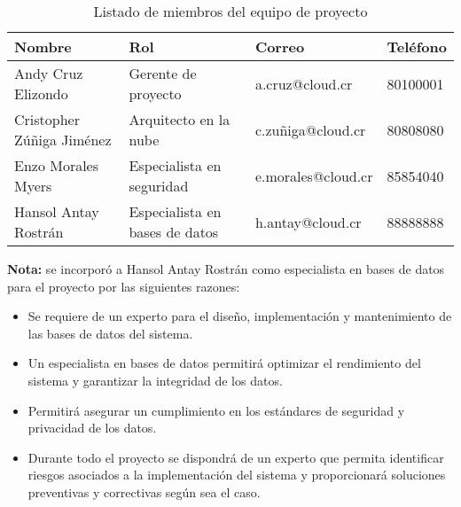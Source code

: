   \begin{table}[H]
        \centering
        \caption{Listado de miembros del equipo de proyecto}
        \begin{tabular}{|p{4.5cm}|p{3.9cm}|p{3.5cm}|p{2cm}|}
            \hline
            \rowcolor{darkblue}
            \color{white} Nombre & \color{white} Rol & \color{white} Correo & \color{white} Teléfono \\ \hline

            \rowcolor{verylightyellow}
            \color{darkblue} Andy Cruz Elizondo  &
            \color{darkblue} Gerente de proyecto  &
            \color{darkblue} a.cruz@cloud.cr &
            \color{darkblue} 80100001\\ \hline

            \rowcolor{verylightyellow}
            \color{darkblue} Cristopher Zúñiga Jiménez &
            \color{darkblue} Arquitecto en la nube &
            \color{darkblue} c.zuñiga@cloud.cr &
            \color{darkblue} 80808080\\ \hline

            \rowcolor{verylightyellow}
            \color{darkblue} Enzo Morales Myers &
            \color{darkblue} Especialista en seguridad &
            \color{darkblue} e.morales@cloud.cr &
            \color{darkblue} 85854040 \\ \hline

            \rowcolor{verylightyellow}
            \color{darkblue} Hansol Antay Rostrán &
            \color{darkblue} Especialista en bases de datos &
            \color{darkblue} h.antay@cloud.cr &
            \color{darkblue} 88888888 \\ \hline
        \end{tabular}
    \end{table}
    

    \textbf{Nota:} se incorporó a Hansol Antay Rostrán como especialista en bases de datos para el proyecto por las siguientes razones:

    \begin{itemize}
      \item Se requiere de un experto para el diseño, implementación y mantenimiento de las bases de datos del sistema.
      \item Un especialista en bases de datos permitirá optimizar el rendimiento del sistema y garantizar la integridad de los datos.
      \item Permitirá asegurar un cumplimiento en los estándares de seguridad y privacidad de los datos.
      \item Durante todo el proyecto se dispondrá de un experto que permita identificar riesgos asociados a la implementación del sistema y proporcionará soluciones preventivas y correctivas según sea el caso.
    \end{itemize}
  
